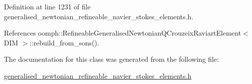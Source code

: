 Definition at line 1231 of file generalised\+\_\+newtonian\+\_\+refineable\+\_\+navier\+\_\+stokes\+\_\+elements.\+h.



References oomph\+::\+Refineable\+Generalised\+Newtonian\+Q\+Crouzeix\+Raviart\+Element$<$ D\+I\+M $>$\+::rebuild\+\_\+from\+\_\+sons().



The documentation for this class was generated from the following file\+:\begin{DoxyCompactItemize}
\item 
\hyperlink{generalised__newtonian__refineable__navier__stokes__elements_8h}{generalised\+\_\+newtonian\+\_\+refineable\+\_\+navier\+\_\+stokes\+\_\+elements.\+h}\end{DoxyCompactItemize}
